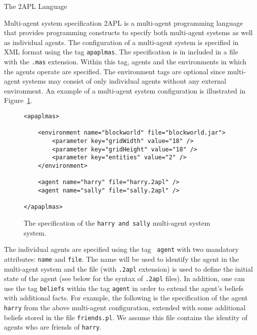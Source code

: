 \renewcommand{\rule}[1]{$\langle #1\rangle$}

\begin{chapter}{The 2APL Language}\label{chap:language}

    \begin{section}{Multi-agent system specification}
        2APL is a multi-agent programming language that provides programming
        constructs to specify both multi-agent systems as well as individual
        agents. The configuration of a multi-agent system is specified in XML
        format using the tag {\tt apaplmas}. The specification is in
        included in a file with the {\tt .mas} extension.
        Within this tag, agents and the environments in which the agents operate are
        specified. The environment tags are optional since multi-agent systems
        may consist of only individual agents without any external
        environment. An example of a multi-agent system
        configuration is illustrated in Figure~\ref{fig:masfile}.

\begin{figure}[ht]
\begin{verbatim}
<apaplmas>

    <environment name="blockworld" file="blockworld.jar">
        <parameter key="gridWidth" value="18" />
        <parameter key="gridHeight" value="18" />
        <parameter key="entities" value="2" />
    </environment>

    <agent name="harry" file="harry.2apl" />
    <agent name="sally" file="sally.2apl" />

</apaplmas>
\end{verbatim}
\caption{The specification of the {\tt harry and sally} multi-agent
system system.}\label{fig:masfile}
\end{figure}

        The individual agents are specified using the tag {\tt
        agent} with two mandatory attributes: {\tt name} and
        {\tt file}. The name will be used to identify the agent in the multi-agent system and the
        file (with {\tt .2apl} extension) is used to define the
        initial state of the agent (see below for the syntax of {\tt .2apl} files).
        In addition, one can use the tag {\tt beliefs} within the
        tag {\tt agent} in order to extend the agent's beliefs with additional facts.
        For example, the following is the specification of the agent {\tt harry} from the
        above multi-agent configuration, extended with some additional
        beliefs stored in the file {\tt friends.pl}. We assume this
        file contains the identity of agents who are friends of {\tt harry}.


\end{section}
\end{chapter}
